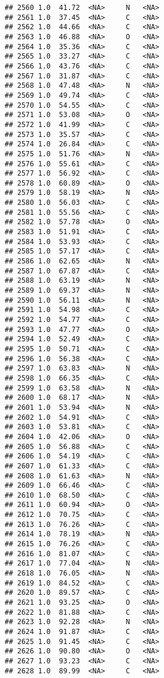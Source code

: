 \documentclass[
]{article}
\begin{document}
\begin{verbatim}
## 2560 1.0  41.72  <NA>     N   <NA>
## 2561 1.0  37.45  <NA>     C   <NA>
## 2562 1.0  44.66  <NA>     C   <NA>
## 2563 1.0  46.88  <NA>     O   <NA>
## 2564 1.0  35.36  <NA>     C   <NA>
## 2565 1.0  33.27  <NA>     C   <NA>
## 2566 1.0  43.76  <NA>     C   <NA>
## 2567 1.0  31.87  <NA>     C   <NA>
## 2568 1.0  47.48  <NA>     N   <NA>
## 2569 1.0  49.74  <NA>     C   <NA>
## 2570 1.0  54.55  <NA>     C   <NA>
## 2571 1.0  53.08  <NA>     O   <NA>
## 2572 1.0  41.99  <NA>     C   <NA>
## 2573 1.0  35.57  <NA>     C   <NA>
## 2574 1.0  26.84  <NA>     C   <NA>
## 2575 1.0  51.76  <NA>     N   <NA>
## 2576 1.0  55.61  <NA>     C   <NA>
## 2577 1.0  56.92  <NA>     C   <NA>
## 2578 1.0  60.89  <NA>     O   <NA>
## 2579 1.0  58.19  <NA>     N   <NA>
## 2580 1.0  56.03  <NA>     C   <NA>
## 2581 1.0  55.56  <NA>     C   <NA>
## 2582 1.0  57.78  <NA>     O   <NA>
## 2583 1.0  51.91  <NA>     C   <NA>
## 2584 1.0  53.93  <NA>     C   <NA>
## 2585 1.0  57.17  <NA>     C   <NA>
## 2586 1.0  62.65  <NA>     N   <NA>
## 2587 1.0  67.87  <NA>     C   <NA>
## 2588 1.0  63.19  <NA>     N   <NA>
## 2589 1.0  69.37  <NA>     N   <NA>
## 2590 1.0  56.11  <NA>     N   <NA>
## 2591 1.0  54.98  <NA>     C   <NA>
## 2592 1.0  54.77  <NA>     C   <NA>
## 2593 1.0  47.77  <NA>     O   <NA>
## 2594 1.0  52.49  <NA>     C   <NA>
## 2595 1.0  50.71  <NA>     C   <NA>
## 2596 1.0  56.38  <NA>     C   <NA>
## 2597 1.0  63.83  <NA>     N   <NA>
## 2598 1.0  66.35  <NA>     C   <NA>
## 2599 1.0  63.58  <NA>     N   <NA>
## 2600 1.0  68.17  <NA>     N   <NA>
## 2601 1.0  53.94  <NA>     N   <NA>
## 2602 1.0  54.91  <NA>     C   <NA>
## 2603 1.0  53.81  <NA>     C   <NA>
## 2604 1.0  42.06  <NA>     O   <NA>
## 2605 1.0  56.88  <NA>     C   <NA>
## 2606 1.0  54.19  <NA>     C   <NA>
## 2607 1.0  61.33  <NA>     C   <NA>
## 2608 1.0  61.63  <NA>     N   <NA>
## 2609 1.0  66.46  <NA>     C   <NA>
## 2610 1.0  68.50  <NA>     C   <NA>
## 2611 1.0  60.94  <NA>     O   <NA>
## 2612 1.0  70.75  <NA>     C   <NA>
## 2613 1.0  76.26  <NA>     C   <NA>
## 2614 1.0  78.19  <NA>     N   <NA>
## 2615 1.0  76.26  <NA>     C   <NA>
## 2616 1.0  81.07  <NA>     C   <NA>
## 2617 1.0  77.04  <NA>     N   <NA>
## 2618 1.0  76.05  <NA>     N   <NA>
## 2619 1.0  84.52  <NA>     C   <NA>
## 2620 1.0  89.57  <NA>     C   <NA>
## 2621 1.0  93.25  <NA>     O   <NA>
## 2622 1.0  81.88  <NA>     C   <NA>
## 2623 1.0  92.28  <NA>     N   <NA>
## 2624 1.0  91.87  <NA>     C   <NA>
## 2625 1.0  91.45  <NA>     C   <NA>
## 2626 1.0  90.80  <NA>     O   <NA>
## 2627 1.0  93.23  <NA>     C   <NA>
## 2628 1.0  89.99  <NA>     C   <NA>

\end{verbatim}
\end{document}
